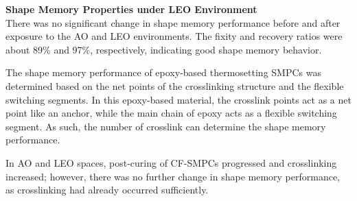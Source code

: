 \documentclass[10pt]{beamer}
\begin{document}
\begin{frame}
\textbf{Shape Memory Properties under LEO Environment}\\
There was no significant change in
shape memory performance before and after exposure to the AO and LEO environments.
The fixity and recovery ratios were about 89\% and 97\%, respectively, indicating good shape
memory behavior.

\begin{figure}[H]
\centering
{}\hfill
{}
\label{fig:main_figure2}
\end{figure}
\end{frame}


\begin{frame}
The shape memory performance of epoxy-based thermosetting SMPCs was determined
based on the net points of the crosslinking structure and the flexible switching
segments. In this epoxy-based material, the crosslink points act as a net point like an anchor, while the main chain of epoxy acts as a flexible switching segment. As such, the
number of crosslink  can determine the shape memory performance. \newline 

In AO and LEO spaces, post-curing of CF-SMPCs progressed and crosslinking increased;
however, there was no further change in shape memory performance, as crosslinking
had already occurred sufficiently. 
\end{frame}
\end{document}
